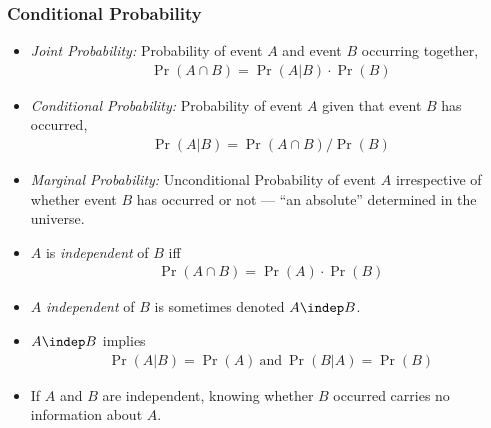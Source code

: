 

\begin{frame}
\frametitle{Conditional Probability}
\begin{itemize}
\item \emph{Joint Probability:} Probability of event $A$ and event $B$ occurring together,
\begin{align*}
\Pr(A \cap B) =  \Pr(A | B) \cdot \Pr(B)
\end{align*}
\item \emph{Conditional Probability:} Probability of event $A$ given that event $B$ has occurred, 
\begin{align*}
\Pr(A | B) = \Pr(A \cap B) / \Pr(B)
\end{align*}
\item \emph{Marginal Probability:} Unconditional Probability of event $A$ irrespective of whether event $B$ has occurred or not --- ``an absolute'' determined in the universe.
\item $A$ is \emph{independent} of $B$ iff 
\begin{align*}
\Pr(A \cap B) = \Pr(A) \cdot \Pr(B)
\end{align*}
\item $A$ \emph{independent} of $B$ is sometimes denoted $A \indep B$.
\item $A \indep B$ implies
\begin{align*}
\Pr(A | B) = \Pr(A) ~\text{and}~ \Pr(B | A) = \Pr(B)
\end{align*}
\item If $A$ and $B$ are independent, knowing whether $B$ occurred carries no information about $A$.
\end{itemize}
\end{frame}

